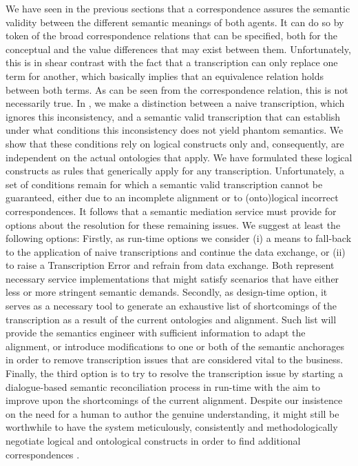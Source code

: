 \documentclass[sort&compress,preprint,authoryear,3p,twocolumn]{elsarticle}
\begin{document}
We have seen in the previous sections that a correspondence assures the
semantic validity between the different semantic meanings of both
agents. It can do so by token of the broad correspondence relations that
can be specified, both for the conceptual and the value differences that
may exist between them. Unfortunately, this is in shear contrast with
the fact that a transcription can only replace one term for another,
which basically implies that an equivalence relation holds between both
terms. As can be seen from the correspondence relation, this is not
necessarily true. In \citep{Brandt2018b}, we make a distinction between
a naive transcription, which ignores this inconsistency, and a semantic
valid transcription that can establish under what conditions this
inconsistency does not yield phantom semantics. We show that these
conditions rely on logical constructs only and, consequently, are
independent on the actual ontologies that apply. We have formulated
these logical constructs as rules that generically apply for any
transcription. Unfortunately, a set of conditions remain for which a
semantic valid transcription cannot be guaranteed, either due to an
incomplete alignment or to (onto)logical incorrect correspondences. It
follows that a semantic mediation service must provide for options about
the resolution for these remaining issues. We suggest at least the
following options: Firstly, as run-time options we consider (i) a means
to fall-back to the application of naive transcriptions and continue the
data exchange, or (ii) to raise a Transcription Error and refrain from
data exchange. Both represent necessary service implementations that
might satisfy scenarios that have either less or more stringent semantic
demands. Secondly, as design-time option, it serves as a necessary tool
to generate an exhaustive list of shortcomings of the transcription as a
result of the current ontologies and alignment. Such list will provide
the semantics engineer with sufficient information to adapt the
alignment, or introduce modifications to one or both of the semantic
anchorages in order to remove transcription issues that are considered
vital to the business. Finally, the third option is to try to resolve
the transcription issue by starting a dialogue-based semantic
reconciliation process in run-time with the aim to improve upon the
shortcomings of the current alignment. Despite our insistence on the
need for a human to author the genuine understanding, it might still be
worthwhile to have the system meticulously, consistently and
methodologically negotiate logical and ontological constructs in order
to find additional correspondences \citep{Diggelen:2007vd}.
\end{document}
